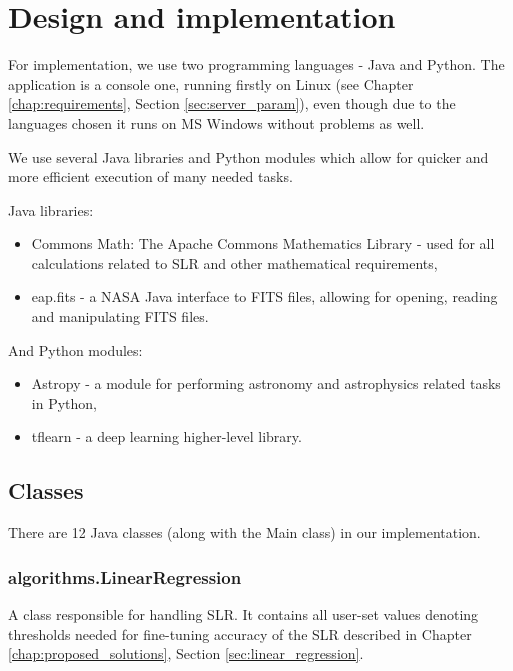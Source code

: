 \chapter{Design and implementation}\label{chap:design}

	For implementation, we use two programming languages - Java and Python. The application is a console one, running firstly on Linux (see Chapter \ref{chap:requirements}, Section \ref{sec:server_param}), even though due to the languages chosen it runs on MS Windows without problems as well.
	
	We use several Java libraries and Python modules which allow for quicker and more efficient execution of many needed tasks.
	
	Java libraries:	
\begin{itemize}
	\item Commons Math: The Apache Commons Mathematics Library - used for all calculations related to SLR and other mathematical requirements,
	\item eap.fits - a NASA Java interface to FITS files, allowing for opening, reading and manipulating FITS files.
\end{itemize}		

	And Python modules:
\begin{itemize}
	\item Astropy - a module for performing astronomy and astrophysics related tasks in Python,
	\item tflearn - a deep learning higher-level library.
\end{itemize}

\section{Classes}\label{sec:classes}

	There are 12 Java classes (along with the Main class) in our implementation.
	
\subsection{algorithms.LinearRegression}

	A class responsible for handling SLR. It contains all user-set values denoting thresholds needed for fine-tuning accuracy of the SLR described in Chapter \ref{chap:proposed_solutions}, Section \ref{sec:linear_regression}.
	

